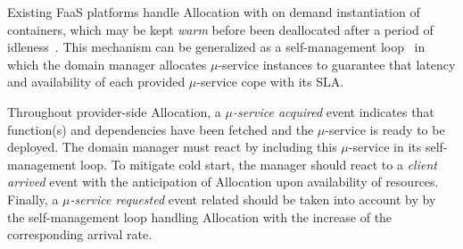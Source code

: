 Existing FaaS platforms handle Allocation with on demand instantiation of containers, which may be kept \textit{warm} before been deallocated after a period of idleness~\cite{AWSLambda, OpenWhisk}. This mechanism can be generalized as a self-management loop~\cite{kephart2003vision} in which the domain manager allocates $\mu$-service instances to guarantee that latency and availability of each provided $\mu$-service cope with its SLA. 


Throughout provider-side Allocation, a \textit{$\mu$-service acquired} event indicates that function(s) and dependencies have been fetched and the $\mu$-service is ready to be deployed. The domain manager must react by including this $\mu$-service in its self-management loop. To mitigate cold start, the manager should react to a \textit{client arrived} event with the anticipation of Allocation upon availability of resources. Finally, a \textit{$\mu$-service requested} event related should be taken into account by by the self-management loop handling Allocation with the increase of the corresponding arrival rate.



%		
%		
%		
%		



